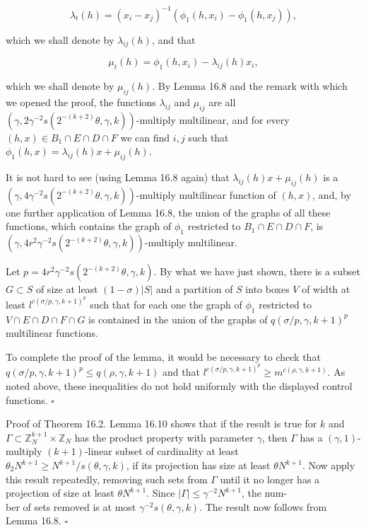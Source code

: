 \documentclass[10pt]{article}
\begin{document}
$$
\lambda_{t}(h)=\left(x_{i}-x_{j}\right)^{-1}\left(\phi_{1}\left(h, x_{i}\right)-\phi_{1}\left(h, x_{j}\right)\right),
$$

which we shall denote by $\lambda_{i j}(h)$, and that

$$
\mu_{t}(h)=\phi_{1}\left(h, x_{i}\right)-\lambda_{i j}(h) x_{i},
$$

which we shall denote by $\mu_{i j}(h)$. By Lemma 16.8 and the remark with which we opened the proof, the functions $\lambda_{i j}$ and $\mu_{i j}$ are all $\left(\gamma, 2 \gamma^{-2} s\left(2^{-(k+2)} \theta, \gamma, k\right)\right)$-multiply multilinear, and for every $(h, x) \in B_{1} \cap E \cap D \cap F$ we can find $i, j$ such that $\phi_{1}(h, x)=\lambda_{i j}(h) x+\mu_{i j}(h)$.

It is not hard to see (using Lemma 16.8 again) that $\lambda_{i j}(h) x+\mu_{i j}(h)$ is a $\left(\gamma, 4 \gamma^{-2} s\left(2^{-(k+2)} \theta, \gamma, k\right)\right)$-multiply multilinear function of $(h, x)$, and, by one further application of Lemma 16.8, the union of the graphs of all these functions, which contains the graph of $\phi_{1}$ restricted to $B_{1} \cap E \cap D \cap F$, is $\left(\gamma, 4 r^{2} \gamma^{-2} s\left(2^{-(k+2)} \theta, \gamma, k\right)\right)$-multiply multilinear.

Let $p=4 r^{2} \gamma^{-2} s\left(2^{-(k+2)} \theta, \gamma, k\right)$. By what we have just shown, there is a subset $G \subset S$ of size at least $(1-\sigma)|S|$ and a partition of $S$ into boxes $V$ of width at least $l^{c(\sigma / p, \gamma, k+1)^{p}}$ such that for each one the graph of $\phi_{1}$ restricted to $V \cap E \cap D \cap F \cap G$ is contained in the union of the graphs of $q(\sigma / p, \gamma, k+1)^{p}$ multilinear functions.

To complete the proof of the lemma, it would be necessary to check that $q(\sigma / p, \gamma, k+1)^{p} \leqslant q(\rho, \gamma, k+1)$ and that $l^{c(\sigma / p, \gamma, k+1)^{p}} \geqslant m^{c(\rho, \gamma, k+1)}$. As noted above, these inequalities do not hold uniformly with the displayed control functions. \(\square\)

Proof of Theorem 16.2. Lemma 16.10 shows that if the result is true for $k$ and $\Gamma \subset \mathbb{Z}_{N}^{k+1} \times \mathbb{Z}_{N}$ has the product property with parameter $\gamma$, then $\Gamma$ has a $(\gamma, 1)$-multiply $(k+1)$-linear subset of cardinality at least $\theta_{2} N^{k+1} \geqslant N^{k+1} / s(\theta, \gamma, k)$, if its projection has size at least $\theta N^{k+1}$. Now apply this result repeatedly, removing such sets from $\Gamma$ until it no longer has a projection of size at least $\theta N^{k+1}$. Since $|\Gamma| \leqslant \gamma^{-2} N^{k+1}$, the num-\\
ber of sets removed is at most $\gamma^{-2} s(\theta, \gamma, k)$. The result now follows from Lemma 16.8. \(\square\)
\end{document}
